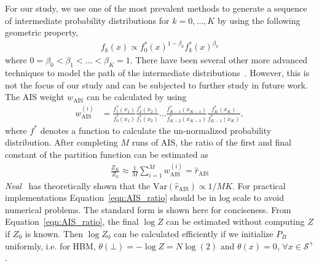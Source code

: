 \documentclass[letterpaper]{article} %
\begin{document}
				For our study, we use one of the most prevalent methods to generate a sequence of intermediate probability distributions for $k=0, \ldots, K$ by using the following geometric property,
				\begin{align*}
					f_{k} \left( x \right) \propto f^{*}_{0} \left( x \right)^{1 - \beta_k} f^{*}_{k} \left( x \right)^{\beta_k}
				\end{align*}
				where $0 = \beta_0 < \beta_1 < \ldots < \beta_K = 1$. There have been several other more advanced techniques to model the path of the intermediate distributions~\cite{grosse2013annealing}. However, this is not the focus of our study and can be subjected to further study in future work. The AIS weight $w_{\mathrm{AIS}}$ can be calculated by using
				\begin{align*}
					w_{\mathrm{AIS}}^{\left( i \right)} &= \frac{ f^{*}_{1} \left( x_{1} \right) }{ f^{*}_{0} \left( x_{1} \right) } \frac{ f^{*}_{2} \left( x_{2} \right) }{ f^{*}_{1} \left( x_{2} \right) } \ldots \frac{ f^{*}_{K-1} \left( x_{K-1} \right) }{ f^{*}_{K-2} \left( x_{K-1} \right) } \frac{ f^{*}_{K} \left( x_{K} \right) }{ f^{*}_{K-1} \left( x_{K} \right) },
				\end{align*}
				where $f^{*}$ denotes a function to calculate the un-normalized probability distribution. After completing $M$ runs of AIS, the ratio of the first and final constant of the partition function can be estimated as
				\begin{align}
					\frac{Z_K}{Z_0} \approx \frac{1}{M} \sum_{i=1}^{M} w_{\mathrm{AIS}}^{\left( i \right)} = \hat{r}_{\mathrm{AIS}} \label{eqn:AIS_ratio}
				\end{align}
				\textit{Neal}~\cite{neal2001annealed,neal2005estimating} has theoretically shown that the $\mathrm{Var} \left( \hat{r}_{\mathrm{AIS}} \right) \propto 1 / MK$. For practical implementations Equation~\eqref{eqn:AIS_ratio} should be in log scale to avoid numerical problems. The standard form is shown here for conciseness. From Equation~\eqref{eqn:AIS_ratio}, the final $\log Z $ can be estimated without computing $Z$ if $Z_0$ is known. Then $\log Z_0$ can be calculated efficiently if we initialize $P_B$ uniformly, i.e. for HBM, $ \theta \left( \bot \right) = - \log Z = N \log \left(2 \right) $ and $ \theta \left( x \right) = 0$, $\forall x\in \mathcal{S}^+ $.
\end{document}
